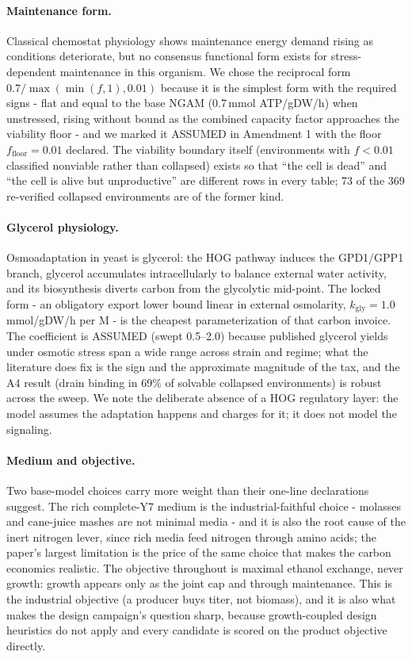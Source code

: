 \documentclass[12pt]{article}
\begin{document}
\paragraph{Maintenance form.} Classical chemostat physiology shows
maintenance energy demand rising as conditions deteriorate, but no
consensus functional form exists for stress-dependent maintenance in
this organism. We chose the reciprocal form
$0.7/\max(\min(f,1),0.01)$ because it is the simplest form with the
required signs - flat and equal to the base NGAM (0.7\,mmol ATP/gDW/h)
when unstressed, rising without bound as the combined capacity factor
approaches the viability floor - and we marked it ASSUMED in
Amendment 1 with the floor $f_{\mathrm{floor}}=0.01$ declared. The
viability boundary itself (environments with $f<0.01$ classified
nonviable rather than collapsed) exists so that ``the cell is dead''
and ``the cell is alive but unproductive'' are different rows in
every table; 73 of the 369 re-verified collapsed environments are of
the former kind.

\paragraph{Glycerol physiology.} Osmoadaptation in yeast is glycerol:
the HOG pathway induces the GPD1/GPP1 branch, glycerol accumulates
intracellularly to balance external water activity, and its
biosynthesis diverts carbon from the glycolytic mid-point. The locked
form - an obligatory export lower bound linear in external osmolarity,
$k_{\mathrm{gly}}=1.0$ mmol/gDW/h per M - is the cheapest
parameterization of that carbon invoice. The coefficient is ASSUMED
(swept 0.5--2.0) because published glycerol yields under osmotic
stress span a wide range across strain and regime; what the
literature does fix is the sign and the approximate magnitude of the
tax, and the A4 result (drain binding in 69\% of solvable collapsed
environments) is robust across the sweep. We note the deliberate
absence of a HOG regulatory layer: the model assumes the adaptation
happens and charges for it; it does not model the signaling.

\paragraph{Medium and objective.} Two base-model choices carry more
weight than their one-line declarations suggest. The rich
complete-Y7 medium is the industrial-faithful choice - molasses and
cane-juice mashes are not minimal media - and it is also the root
cause of the inert nitrogen lever, since rich media feed nitrogen
through amino acids; the paper's largest limitation is the price of
the same choice that makes the carbon economics realistic. The
objective throughout is maximal ethanol exchange, never growth:
growth appears only as the joint cap and through maintenance. This is
the industrial objective (a producer buys titer, not biomass), and it
is also what makes the design campaign's question sharp, because
growth-coupled design heuristics do not apply and every candidate is
scored on the product objective directly.
\end{document}
